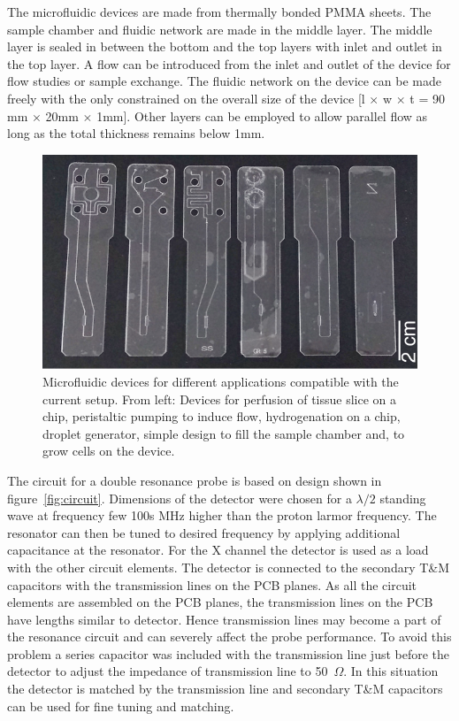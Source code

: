 \documentclass[preprint,12pt]{article}
\begin{document}
The microfluidic devices are made from thermally bonded PMMA sheets. The sample chamber and fluidic network are made in the middle layer. The middle layer is sealed in between the bottom and the top layers with inlet and outlet in the top layer. A flow can be introduced from the inlet and outlet of the device for flow studies or sample exchange. The fluidic network on the device can be made freely with the only constrained on the overall size of the device [l $\times$ w $\times$ t = 90 mm $\times$ 20mm $\times$ 1mm]. Other layers can be employed to allow parallel flow as long as the total thickness remains below 1mm.\par
\begin{figure}
\centering
\includegraphics[width=\linewidth,keepaspectratio=true]{./figures/ms5n17-tlp-im-181007-devices.png} 
\caption{Microfluidic devices for different applications compatible with the current setup. From left: Devices for perfusion of tissue slice on a chip, peristaltic pumping to induce flow, hydrogenation on a chip, droplet generator, simple design to fill the sample chamber and, to grow cells on the device.}
\label{fig:device} 
\end{figure}
The circuit for a double resonance probe is based on design shown in figure~\ref{fig:circuit}. Dimensions of the detector were chosen for a $\lambda/2$ standing wave at frequency few 100s MHz higher than the proton larmor frequency. The resonator can then be tuned to desired frequency by applying additional capacitance at the resonator. For the X channel the detector is used as a load with the other circuit elements. The detector is connected to the secondary T\&M capacitors with the transmission lines on the PCB planes. As all the circuit elements are assembled on the PCB planes, the transmission lines on the PCB have lengths similar to detector. Hence transmission lines may become a part of the resonance circuit and can severely affect the probe performance. To avoid this problem a series capacitor was included with the transmission line just before the detector to adjust the impedance of transmission line to 50~$\Omega$. In this situation the detector is matched by the transmission line and secondary T\&M capacitors can be used for fine tuning and matching.\par
\end{document}
